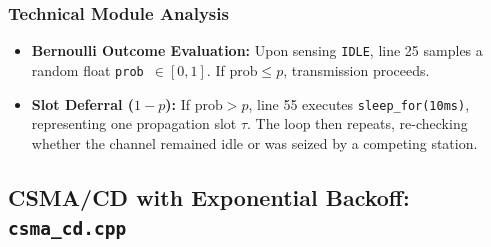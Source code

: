 \documentclass[12pt, a4paper]{article}
\begin{document}
\subsubsection{Technical Module Analysis}
\begin{itemize}
    \item \textbf{Bernoulli Outcome Evaluation:} Upon sensing \texttt{IDLE}, line 25 samples a random float \texttt{prob $\in [0, 1]$}. If $\text{prob} \le p$, transmission proceeds.
    \item \textbf{Slot Deferral ($1-p$):} If $\text{prob} > p$, line 55 executes \texttt{sleep\_for(10ms)}, representing one propagation slot $\tau$. The loop then repeats, re-checking whether the channel remained idle or was seized by a competing station.
\end{itemize}

\subsection{CSMA/CD with Exponential Backoff: \texttt{csma\_cd.cpp}}
\end{document}

